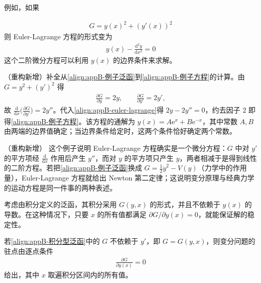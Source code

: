 \documentclass[../main.tex]{subfiles}
\begin{document}
例如，如果
\begin{example}\label{example:appB-积分型泛函例子}
\begin{align}
  G=y(x)^{2}+(y'(x))^{2}
  \label{align:appB-例子泛函}
\end{align}
则 Euler-Lagrange 方程的形式变为
\begin{align}
  y(x)-\frac{\mathrm{d}^{2}y}{\mathrm{d}x^{2}}=0
  \label{align:appB-例子方程}
\end{align}
这个二阶微分方程可以利用 $y(x)$ 的边界条件来求解。
\end{example}

\begin{solution}
（重构新增）补全从\eqref{align:appB-例子泛函}到\eqref{align:appB-例子方程}的计算。由 $G=y^{2}+(y')^{2}$ 得
\begin{align*}
  \frac{\partial G}{\partial y}=2y,\qquad \frac{\partial G}{\partial y'}=2y',
\end{align*}
故 $\frac{\mathrm{d}}{\mathrm{d}x}\bigl(\frac{\partial G}{\partial y'}\bigr)=2y''$。代入\eqref{align:appB-euler-lagrange}得 $2y-2y''=0$，约去因子 $2$ 即得\eqref{align:appB-例子方程}。该方程的通解为 $y(x)=A\mathrm{e}^{x}+B\mathrm{e}^{-x}$，其中常数 $A,B$ 由两端的边界值确定；当边界条件给定时，这两个条件恰好确定两个常数。
\end{solution}

\begin{remark}（重构新增）
这个例子说明 Euler-Lagrange 方程确实是一个微分方程：$G$ 中对 $y'$ 的平方项经 $\frac{\mathrm{d}}{\mathrm{d}x}$ 作用后产生 $y''$，而对 $y$ 的平方项只产生 $y$，两者相减于是得到线性的二阶方程。若把\eqref{align:appB-例子泛函}换成 $G=\frac{1}{2}\dot{y}^{2}-V(y)$（力学中的作用量），Euler-Lagrange 方程就给出 Newton 第二定律；这说明变分原理与经典力学的运动方程是同一件事的两种表述。
\end{remark}

考虑由积分定义的泛函，其积分采用 $G(y,x)$ 的形式，并且不依赖于 $y(x)$ 的导数。在这种情况下，只要 $x$ 的所有值都满足 $\partial G/\partial y(x)=0$，就能保证解的稳定性。

\begin{proposition}[不含导数的泛函的驻点条件]\label{proposition:appB-不含导数}
若\eqref{align:appB-积分型泛函}中的 $G$ 不依赖于 $y'$，即 $G=G(y,x)$，则变分问题的驻点由逐点条件
\begin{align*}
  \frac{\partial G}{\partial y(x)}=0
\end{align*}
给出，其中 $x$ 取遍积分区间内的所有值。
\end{proposition}
\end{document}
